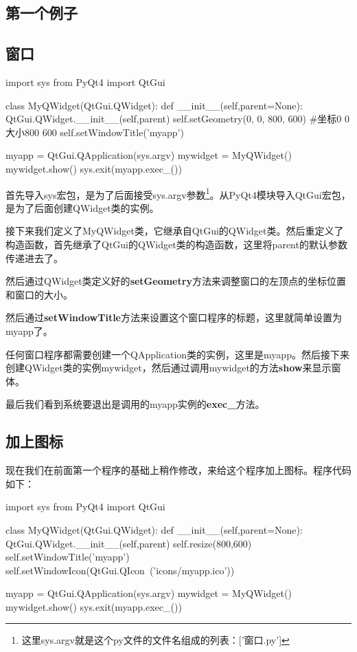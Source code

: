 \documentclass[12pt,oneside]{book}
\begin{document}
\begin{common-format}
\chapter{第一个例子}
\section{窗口}
\begin{tcbpython}
import sys
from PyQt4  import QtGui

class MyQWidget(QtGui.QWidget):
    def __init__(self,parent=None):
        QtGui.QWidget.__init__(self,parent)
        self.setGeometry(0, 0, 800, 600)
        #坐标0 0 大小800 600
        self.setWindowTitle('myapp')

myapp = QtGui.QApplication(sys.argv)
mywidget = MyQWidget()
mywidget.show()
sys.exit(myapp.exec_())
\end{tcbpython}

首先导入sys宏包，是为了后面接受sys.argv参数\footnote{这里sys.argv就是这个py文件的文件名组成的列表：['窗口.py']}。从PyQt4模块导入QtGui宏包，是为了后面创建QWidget类的实例。

接下来我们定义了MyQWidget类，它继承自QtGui的QWidget类。然后重定义了构造函数，首先继承了QtGui的QWidget类的构造函数，这里将parent的默认参数传递进去了。

然后通过QWidget类定义好的\textbf{setGeometry}方法来调整窗口的左顶点的坐标位置和窗口的大小。

然后通过\textbf{setWindowTitle}方法来设置这个窗口程序的标题，这里就简单设置为myapp了。

任何窗口程序都需要创建一个QApplication类的实例，这里是myapp。然后接下来创建QWidget类的实例mywidget，然后通过调用mywidget的方法\textbf{show}来显示窗体。

最后我们看到系统要退出是调用的myapp实例的\textbf{exec\_}方法。


\section{加上图标}
现在我们在前面第一个程序的基础上稍作修改，来给这个程序加上图标。程序代码如下：
\begin{tcbpython}
import sys
from PyQt4  import QtGui

class MyQWidget(QtGui.QWidget):
    def __init__(self,parent=None):
        QtGui.QWidget.__init__(self,parent)
        self.resize(800,600)
        self.setWindowTitle('myapp')
        self.setWindowIcon(QtGui.QIcon\
        ('icons/myapp.ico'))


myapp = QtGui.QApplication(sys.argv)
mywidget = MyQWidget()
mywidget.show()
sys.exit(myapp.exec_())
\end{tcbpython}




\end{common-format}
\end{document}

